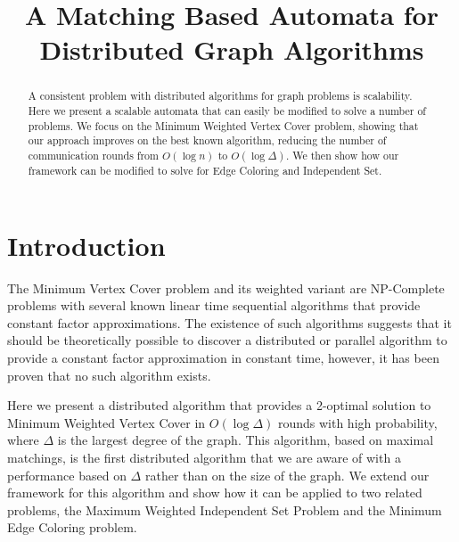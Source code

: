 \documentclass[conference, 10pt, letter]{IEEEtran}
\begin{document}
\title{A Matching Based Automata for Distributed Graph Algorithms}

\author{
}

\maketitle

\begin{abstract}
A consistent problem with distributed algorithms for graph problems is scalability. Here we present a scalable automata that can easily be modified to solve a number of problems. We focus on the Minimum Weighted Vertex Cover problem, showing that our approach improves on the best known algorithm, reducing the number of communication rounds from \( O(\log n) \) to \( O(\log \Delta) \). We then show how our framework can be modified to solve for Edge Coloring and Independent Set.
\end{abstract}

\section{Introduction}


The Minimum Vertex Cover problem and its weighted variant are NP-Complete problems with several known linear time sequential algorithms that provide constant factor approximations. The existence of such algorithms suggests that it should be theoretically possible to discover a distributed or parallel algorithm to provide a constant factor approximation in constant time, however, it has been proven that no such algorithm exists\cite{1011811}. 

Here we present a distributed algorithm that provides a 2-optimal solution to Minimum Weighted Vertex Cover in $O(\log\Delta)$ rounds with high probability, where $\Delta$ is the largest degree of the graph. This algorithm, based on maximal matchings, is the first distributed algorithm that we are aware of with a performance based on $\Delta$ rather than on the size of the graph. We extend our framework for this algorithm and show how it can be applied to two related problems, the Maximum Weighted Independent Set Problem and the Minimum Edge Coloring problem.
\end{document}
